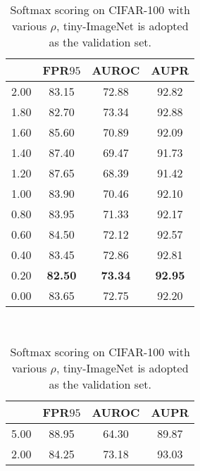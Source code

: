 \documentclass{article}
\begin{document}
\begin{table}[t]
\centering
\parbox{.30\linewidth}{
\centering
\scriptsize
\caption{Softmax scoring on CIFAR-$100$ with various $\sigma_1$, tiny-ImageNet is adopted as the validation set.} 
\vspace{5pt}
{
\begin{tabular}{c|ccc}
\toprule[1.5pt]
             & FPR$95$     & AUROC       & AUPR      \\
\midrule[0.6pt]
2.00               & 83.15                  & 72.88                  & 92.82      \\
1.80               & 82.70                  & 73.34                  & 92.88      \\
1.60               & 85.60                  & 70.89                  & 92.09       \\
1.40               & 87.40                  & 69.47                  & 91.73      \\
1.20               & 87.65                  & 68.39                  & 91.42      \\
1.00               & 83.90                  & 70.46                  & 92.10 \\ 
0.80               & 83.95                  & 71.33                  & 92.17 \\
0.60               & 84.50                  & 72.12                  & 92.57 \\ 
0.40               & {83.45}                  & {72.86}                  & {92.81} \\
\cellcolor{greyC}0.20               & \cellcolor{greyC}\textbf{82.50}         & \cellcolor{greyC}\textbf{73.34}         & \cellcolor{greyC}\textbf{92.95} \\
0.00               & 83.65                       & 72.75                        & 92.20     \\ 
\bottomrule[1.5pt]      
\end{tabular}
}}~~
\parbox{.30\linewidth}{
\centering
\caption{Softmax scoring on CIFAR-100 with various $\rho$, tiny-ImageNet is adopted as the validation set.} 
\scriptsize
\vspace{5pt}
{
\begin{tabular}{c|ccc}
\toprule[1.5pt]
            & FPR$95$     & AUROC      & AUPR      \\
\midrule[0.6pt]
5.00               & 88.95                  & 64.30                  & 89.87       \\
2.00               & 84.25                  & 73.18                  & 93.03       \\

\end{tabular}}}
\end{table}
\end{document}

